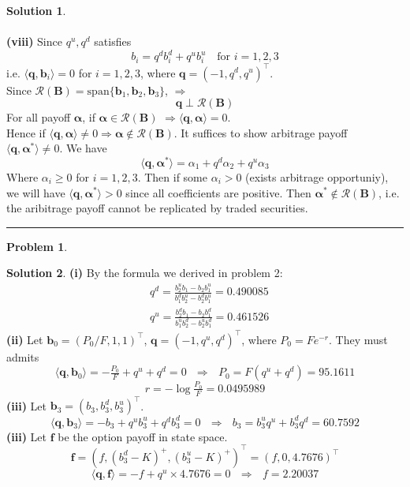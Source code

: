 \documentclass[a4paper, 10pt]{article}
\theoremstyle{definition}
\newtheorem{problem}{Problem}
\theoremstyle{hSol}
\newtheorem*{solution}{Solution}
\begin{document}
\begin{solution}
\begin{equation}
\end{equation}
~\\
\textbf{(viii)} Since $q^u, q^d$ satisfies
$$
b_i = q^d b_i^d + q^u b_i^u\text{~~~for~} i =1,2,3
$$
i.e. $\langle \bm{q}, \bm{b}_i \rangle = 0$ for $i=1,2,3$, where $\bm{q}=(-1, q^d, q^u)^{\top}$.\\
Since $\mathcal{R}(\bm{B}) = \text{span}\{\bm{b}_1, \bm{b}_2, \bm{b}_3\}$, $\Rightarrow$
$$
\bm{q} \perp \mathcal{R}(\bm{B})
$$
For all payoff $\bm{\alpha}$, if $\bm{\alpha}\in \mathcal{R}(\bm{B})$ $\Rightarrow \langle \bm{q}, \bm{\alpha} \rangle =0$. \\
Hence if $ \langle \bm{q}, \bm{\alpha} \rangle \ne 0 \Rightarrow \bm{\alpha} \notin \mathcal{R}(\bm{B})$. It suffices to show arbitrage payoff $\langle \bm{q},\bm{\alpha}^* \rangle \ne 0$. We have
$$
\langle \bm{q},\bm{\alpha}^* \rangle = \alpha_1 + q^d \alpha_2+ q^u \alpha_3
$$
Where $\alpha_i\geq 0$ for $i=1,2,3$. Then if some $\alpha_i>0$ (exists arbitrage opportuniy), we will have
$\langle \bm{q},\bm{\alpha}^* \rangle > 0$ since all coefficients are positive. Then $\bm{\alpha}^* \notin \mathcal{R}(\bm{B})$, i.e. the aribitrage payoff cannot be replicated by traded securities.

\end{solution}

\noindent\rule{16cm}{0.4pt}
\begin{problem}
\end{problem}
\begin{solution} \textbf{(i)} By the formula we derived in problem 2:
\begin{equation}
  \begin{split}
    &q^d = \frac{b_2^u b_1 - b_2 b_1^u}{b_1^d b_2^u - b_2^d b_1^u} = 0.490085\\
    &q^u = \frac{b_2^d b_1 - b_2 b_1^d}{b_1^u b_2^d - b_2^u b_1^d} = 0.461526
  \end{split}
\end{equation}
\textbf{(ii)} Let $\bm{b}_0 = (P_0/F, 1, 1)^{\top}$, $\bm{q}=(-1, q^u, q^d)^{\top}$, where $P_0 = Fe^{-r}$. They must admits
$$
\langle \bm{q}, \bm{b}_0 \rangle = -\tfrac{P_0}{F} + q^u + q^d = 0~~~\Rightarrow~~~P_0 = F(q^u+q^d) = 95.1611
$$
$$
r = -\log \tfrac{P_0}{F} = 0.0495989
$$
\textbf{(iii)} Let $\bm{b}_3 = (b_3, b_3^d, b^u_3)^{\top}$.
\begin{equation}
  \langle \bm{q}, \bm{b}_3 \rangle = -b_3 + q^u b_3^u + q^db_3^d = 0~~~\Rightarrow~~~b_3 = b_3^u q^u+b_3^d q^d = 60.7592
\end{equation}
\textbf{(iii)} Let $\bm{f}$ be the option payoff in state space.
$$
\bm{f} = (f, (b_3^d-K)^+, (b^u_3-K)^+)^{\top} = (f, 0, 4.7676)^{\top}
$$
\begin{equation}
  \langle \bm{q}, \bm{f} \rangle = -f + q^u \times 4.7676  = 0~~~\Rightarrow~~~f = 2.20037
\end{equation}
\end{solution}
\end{document}

